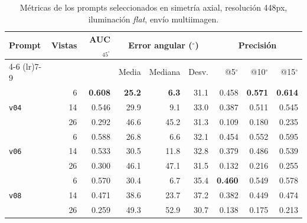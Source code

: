 % 


\begin{table}[H]
\centering
\caption{Métricas de los prompts seleccionados en simetría axial, resolución 448px, iluminación \textit{flat}, envío multiimagen.}
\label{tab:nov_axis_448}
\footnotesize
\setlength{\tabcolsep}{3pt}
\renewcommand{\arraystretch}{0.95}

\begin{tabular*}{\textwidth}{@{\extracolsep{\fill}}lrrrrrrrr@{}}
\toprule
\multirow{2}{*}{Prompt} & \multirow{2}{*}{Vistas} & \multirow{2}{*}{AUC$_{45^\circ}$} & \multicolumn{3}{c}{Error angular ($^\circ$)} & \multicolumn{3}{c}{Precisión} \\
\cmidrule(lr){4-6} \cmidrule(lr){7-9}
 &  &  & Media & Mediana & Desv. & @5$^\circ$ & @10$^\circ$ & @15$^\circ$ \\
\midrule
\multirow{3}{*}{\texttt{v04}} & 6 & \textbf{0.608} & \textbf{25.2} & \textbf{6.3} & 31.1 & 0.458 & \textbf{0.571} & \textbf{0.614} \\
 & 14 & 0.546 & 29.9 & 9.1 & 33.0 & 0.387 & 0.511 & 0.545 \\
 & 26 & 0.292 & 46.6 & 45.2 & 31.3 & 0.109 & 0.180 & 0.235 \\
\midrule
\multirow{3}{*}{\texttt{v06}} & 6 & 0.588 & 26.8 & 6.6 & 32.1 & 0.454 & 0.552 & 0.595 \\
 & 14 & 0.533 & 30.5 & 11.8 & 32.8 & 0.379 & 0.486 & 0.539 \\
 & 26 & 0.300 & 46.1 & 47.1 & 31.5 & 0.132 & 0.216 & 0.255 \\
\midrule
\multirow{3}{*}{\texttt{v08}} & 6 & 0.570 & 30.4 & 6.7 & 35.4 & \textbf{0.460} & 0.549 & 0.578 \\
 & 14 & 0.471 & 38.6 & 23.7 & 37.2 & 0.382 & 0.449 & 0.474 \\
 & 26 & 0.259 & 49.3 & 52.9 & 30.7 & 0.138 & 0.175 & 0.213 \\
\bottomrule
\end{tabular*}


\end{table}
